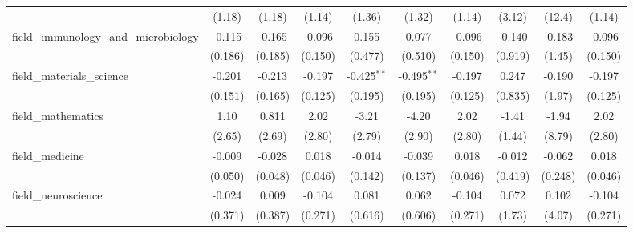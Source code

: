 \begin{tabular}{lccccccccc}
                                                               & (1.18)         & (1.18)         & (1.14)        & (1.36)        & (1.32)        & (1.14)        & (3.12)        & (12.4)  & (1.14)\\   
   field\_immunology\_and\_microbiology                        & -0.115         & -0.165         & -0.096        & 0.155         & 0.077         & -0.096        & -0.140        & -0.183  & -0.096\\   
                                                               & (0.186)        & (0.185)        & (0.150)       & (0.477)       & (0.510)       & (0.150)       & (0.919)       & (1.45)  & (0.150)\\   
   field\_materials\_science                                   & -0.201         & -0.213         & -0.197        & -0.425$^{**}$ & -0.495$^{**}$ & -0.197        & 0.247         & -0.190  & -0.197\\   
                                                               & (0.151)        & (0.165)        & (0.125)       & (0.195)       & (0.195)       & (0.125)       & (0.835)       & (1.97)  & (0.125)\\   
   field\_mathematics                                          & 1.10           & 0.811          & 2.02          & -3.21         & -4.20         & 2.02          & -1.41         & -1.94   & 2.02\\   
                                                               & (2.65)         & (2.69)         & (2.80)        & (2.79)        & (2.90)        & (2.80)        & (1.44)        & (8.79)  & (2.80)\\   
   field\_medicine                                             & -0.009         & -0.028         & 0.018         & -0.014        & -0.039        & 0.018         & -0.012        & -0.062  & 0.018\\   
                                                               & (0.050)        & (0.048)        & (0.046)       & (0.142)       & (0.137)       & (0.046)       & (0.419)       & (0.248) & (0.046)\\   
   field\_neuroscience                                         & -0.024         & 0.009          & -0.104        & 0.081         & 0.062         & -0.104        & 0.072         & 0.102   & -0.104\\   
                                                               & (0.371)        & (0.387)        & (0.271)       & (0.616)       & (0.606)       & (0.271)       & (1.73)        & (4.07)  & (0.271)\\   

\end{tabular}
